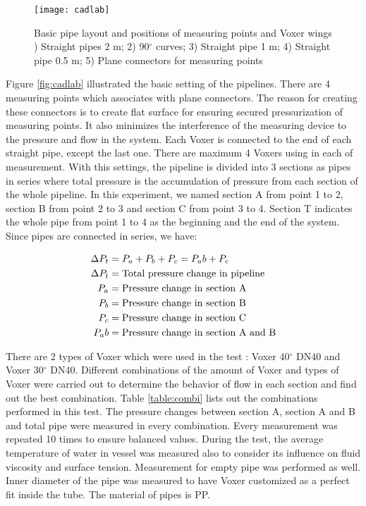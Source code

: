 \begin{figure}[h]
  \centering
  \texttt{[image: cadlab]}
  \caption{ Basic pipe layout and positions of measuring points and Voxer wings ) Straight pipes 2 m; 2) 90$^{\circ}$ curves; 3) Straight pipe 1 m; 4) Straight pipe 0.5 m; 5) Plane connectors for measuring points}
  \label{fig:cadlab}
\end{figure}

Figure \vref{fig:cadlab} illustrated the basic setting of the pipelines. There are 4 measuring points which associates with plane connectors. The reason for creating these connectors is to create flat surface for ensuring secured pressurization of measuring points. It also minimizes the interference of the measuring device to the pressure and flow in the system. Each Voxer is connected to the end of each straight pipe, except the last one. There are maximum 4 Voxers using in each of measurement. With this settings, the pipeline is divided into 3 sections as pipes in series where total pressure is the accumulation of pressure from each section of the whole pipeline. In this experiment, we named section A from point 1 to 2, section B from point 2 to 3 and section C from point 3 to 4. Section T indicates the whole pipe from point 1 to 4 as the beginning and the end of the system. 
Since pipes are connected in series, we have:

\begin{align}
\Delta P_t&= P_a + P_b + P_c = P_ab + P_c \\
\Delta P_t&= \textnormal{Total pressure change in pipeline} \\
P_a&= \textnormal{Pressure change in section A} \\
P_b&= \textnormal{Pressure change in section B} \\
P_c&= \textnormal{Pressure change in section C} \\
P_ab&= \textnormal{Pressure change in section A and B} \\
\end{align}

There are 2 types of Voxer which were used in the test : Voxer 40$^{\circ}$ DN40 and Voxer 30$^{\circ}$ DN40.  Different combinations of the amount of Voxer and types of Voxer were carried out to determine the behavior of flow in each section and find out the best combination. Table \ref{table:combi} lists out the combinations performed in this test. The pressure changes between section A, section A and B and total pipe were measured in every combination. Every measurement was repeated 10 times to ensure balanced values. During the test, the average temperature of water in vessel was measured also to consider its influence on fluid viscosity and surface tension. Measurement for empty pipe was performed as well. Inner diameter of the pipe was measured to have Voxer customized as a perfect fit inside the tube. The material of pipes is PP.

